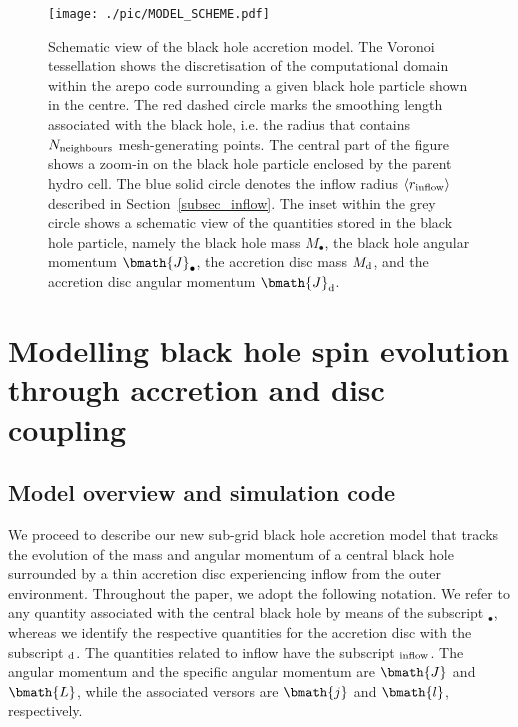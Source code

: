 \documentclass[a4paper,fleqn,usenatbib]{mnras}
\begin{document}
\begin{figure}
\begin{center}
\texttt{[image: ./pic/MODEL\_SCHEME.pdf]}
\caption{
Schematic view of the black hole accretion model. 
The Voronoi tessellation shows the discretisation of the computational domain within the {\sc arepo} code surrounding a given black hole particle shown in the centre.
The red dashed circle marks the smoothing length associated with the black hole, i.e. the radius that contains $N_{\rm neighbours}$ mesh-generating points.
The central part of the figure shows a zoom-in on the black hole particle enclosed by the parent hydro cell. 
The blue solid circle denotes the inflow radius $\langle r_{\rm inflow} \rangle$ described in Section~\ref{subsec_inflow}.
The inset within the grey circle shows a schematic view of the quantities stored in the black hole particle, namely the black hole mass $M_{\bullet}$, the black hole angular momentum $\bmath{J}_{\bullet}$, the accretion disc mass $M_{\rm d}$, and the accretion disc angular momentum $\bmath{J}_{\rm d}$.
}
\label{fig_model_scheme}
\end{center}
\end{figure}


\section{Modelling black hole spin evolution through accretion and disc coupling} \label{sec_model_description}


\subsection{Model overview and simulation code}

We proceed to describe our new sub-grid black hole accretion model that tracks the evolution of the mass and angular momentum of a central black hole surrounded by a thin accretion disc experiencing inflow from the outer environment.
Throughout the paper, we adopt the following notation.
We refer to any quantity associated with the central black hole by means of the subscript $_{\bullet}$, whereas we identify the respective quantities for the accretion disc with the subscript $_{\rm d}$.
The quantities related to inflow have the subscript $_{\rm inflow}$.
The angular momentum and the specific angular momentum are $\bmath{J}$ and $\bmath{L}$, while the associated versors are $\bmath{j}$ and $\bmath{l}$, respectively. 
\end{document}
